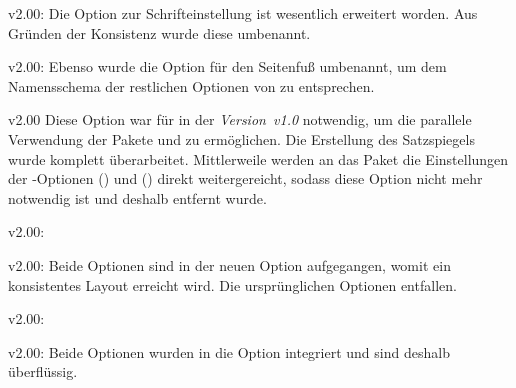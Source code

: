 \begin{Obsolete}{v2.00:}{}
\printobsoletelist%
%
Die Option zur Schrifteinstellung ist wesentlich erweitert worden. Aus Gründen 
der Konsistenz wurde diese umbenannt.
\end{Obsolete}

\begin{Obsolete}{v2.00:}{}
\printobsoletelist%
%
Ebenso wurde die Option für den Seitenfuß umbenannt, um dem Namensschema der 
restlichen Optionen von \TUDScript zu entsprechen.
\end{Obsolete}

\begin{Obsolete}{v2.00}{}{%
}
\printobsoletelist%
%
Diese Option war für \TUDScript in der \emph{Version~v1.0} notwendig, um die 
parallele Verwendung der Pakete  und  zu 
ermöglichen. Die Erstellung des Satzspiegels wurde komplett überarbeitet. 
Mittlerweile werden an das Paket  die Einstellungen der 
\KOMAScript-Optionen () und 
() direkt weitergereicht, sodass diese 
Option nicht mehr notwendig ist und deshalb entfernt wurde.
\end{Obsolete}

\begin{Obsolete}{v2.00:}{%
}
\begin{Obsolete}{v2.00:}{%
}
\printobsoletelist%
%
Beide Optionen sind in der neuen Option  
aufgegangen, womit ein konsistentes Layout erreicht wird. Die ursprünglichen 
Optionen entfallen. 
\end{Obsolete}
\end{Obsolete}

\begin{Obsolete}{v2.00:}{}
\begin{Obsolete}{v2.00:}{}
\printobsoletelist%
%
Beide Optionen wurden in die Option  integriert und sind 
deshalb überflüssig.
\end{Obsolete}
\end{Obsolete}

